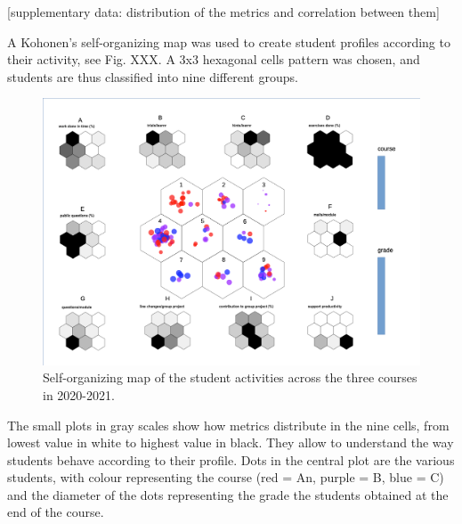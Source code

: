\documentclass[
]{article}
\begin{document}
{[}supplementary data: distribution of the metrics and correlation
between them{]}

A Kohonen's self-organizing map was used to create student profiles
according to their activity, see Fig. XXX. A 3x3 hexagonal cells pattern
was chosen, and students are thus classified into nine different groups.

\begin{figure}
\includegraphics[width=6.06in]{figures/som} \caption{Self-organizing map of the student activities across the three courses in 2020-2021.}\label{fig:som}
\end{figure}

The small plots in gray scales show how metrics distribute in the nine
cells, from lowest value in white to highest value in black. They allow
to understand the way students behave according to their profile. Dots
in the central plot are the various students, with colour representing
the course (red = An, purple = B, blue = C) and the diameter of the dots
representing the grade the students obtained at the end of the course.
\end{document}
